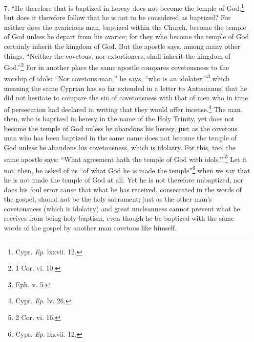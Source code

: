 7. ``He therefore that is baptized in heresy does not become the temple of God;\footnote{\par  Cypr. \emph{Ep}. lxxvii. 12.} but does it therefore follow that he is not to be considered as baptized? For neither does the avaricious man, baptized within the Church, become the temple of God unless he depart from his avarice; for they who become the temple of God certainly inherit the kingdom of God. But the apostle says, among many other things, ``Neither the covetous, nor extortioners, shall inherit the kingdom of God.''\footnote{\par  1 Cor. vi. 10.} For in another place the same apostle compares covetousness to the worship of idols: ``Nor covetous man,'' he says, ``who is an idolater;''\footnote{\par  Eph. v. 5.} which meaning the same Cyprian has so far extended in a letter to Antonianus, that he did not hesitate to compare the sin of covetousness with that of men who in time of persecution had declared in writing that they would offer incense.\footnote{\par  Cypr. \emph{Ep}. lv. 26.} The man, then, who is baptized in heresy in the name of the Holy Trinity, yet does not become the temple of God unless he abandons his heresy, just as the covetous man who has been baptized in the same name does not become the temple of God unless he abandons his covetousness, which is idolatry. For this, too, the same apostle says: ``What agreement hath the temple of God with idols?''\footnote{\par  2 Cor. vi. 16.} Let it not, then, be asked of us ``of what God he is made the temple''\footnote{\par  Cypr. \emph{Ep}. lxxvii. 12.} when we say that he is not made the temple of God at all. Yet he is not therefore unbaptized, nor does his foul error cause that what he has received, consecrated in the words of the gospel, should not be the holy sacrament; just as the other man’s covetousness (which is idolatry) and great uncleanness cannot prevent what he receives from being holy baptism, even though he be baptized with the same words of the gospel by another man covetous like himself.


